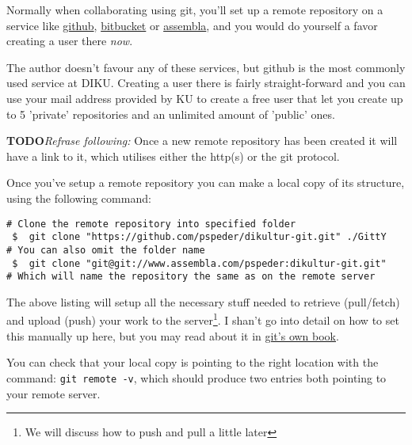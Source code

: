 \documentclass[11pt,a4paper,oneside,final,titlepage]{article}
\newcommand{\todo}[1]{\color{red}\textbf{TODO}\hspace{0.1in}\textit{#1}\color{black}}
\begin{document}
Normally when collaborating using git, you'll set up a remote repository on a
service like \mbox{\href{http://github.com}{github}},
\mbox{\href{http://bitbucket.com}{bitbucket}} or
\mbox{\href{http://assembla.com}{assembla}}, and you would do yourself a favor
creating a user there \textit{now}.

The author doesn't favour any of these services, but github is the most commonly
used service at DIKU. Creating a user there is fairly straight-forward and you
can use your mail address provided by KU to create a free user that let you
create up to 5 'private' repositories and an unlimited amount of 'public' ones.

\todo{Refrase following:} Once a new remote repository has been created it will have a link to it, which
utilises either the http(s) or the git protocol.

Once you've setup a remote repository you can make a local copy of its structure,
using the following command:
\begin{lstlisting}[label=lst:cloning,caption=How to clone a repository,
                   name=lst:cloning,style=git]
# Clone the remote repository into specified folder
 $  git clone "https://github.com/pspeder/dikultur-git.git" ./GittY
# You can also omit the folder name
 $  git clone "git@git://www.assembla.com/pspeder:dikultur-git.git"
# Which will name the repository the same as on the remote server
\end{lstlisting}
The above listing will setup all the necessary stuff needed to retrieve
(pull/fetch) and upload (push) your work to the server\footnote{We will discuss
how to push and pull a little later}. I shan't go into detail on how to set this
manually up here, but you may read about it in \href{http://scm-git.com/book/}
{git's own book}.

You can check that your local copy is pointing to the right location with the
command: \lstinline[style=git]{git remote -v}, which should produce two entries
both pointing to your remote server.
\end{document}
